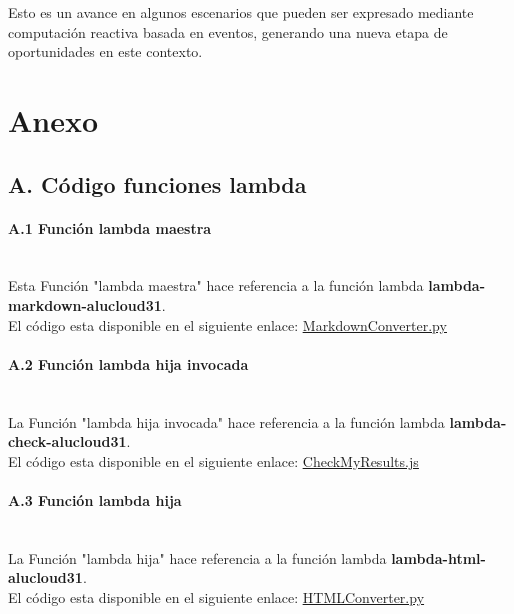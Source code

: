 \documentclass[
]{article}
\begin{document}
Esto es un avance en algunos escenarios que pueden ser expresado mediante computación reactiva basada en eventos, generando una nueva etapa de oportunidades en este contexto.

\newpage
\hypertarget{header-n212}{%
\section{Anexo}\label{header-n212}}

\hypertarget{header-n213}{%
\subsection{A. Código funciones lambda}\label{header-n213}}



\hypertarget{header-n214}{%
\paragraph{A.1 Función lambda maestra}\label{header-n214}}
\leavevmode
\newline
\\
Esta Función "lambda maestra" hace referencia a la función lambda \textbf{lambda-markdown-alucloud31}.\\
El código esta disponible en el siguiente enlace:  \underline{\href{https://github.com/manujose94/FINAL-PROJECT-ICP/blob/main/parent-lambda-code/MarkdownConverter.py}{MarkdownConverter.py}}\\

\hypertarget{header-n216}{%
\paragraph{A.2 Función lambda hija invocada}\label{header-n216}}
\leavevmode
\newline
\\
La Función "lambda hija invocada" hace referencia a la función lambda \textbf{lambda-check-alucloud31}.\\
El código esta disponible en el siguiente enlace:  \underline{\href{https://github.com/manujose94/FINAL-PROJECT-ICP/blob/main/childnode-lambda-code/CheckMyResults.js}{CheckMyResults.js}}\\
\hypertarget{header-n218}{%
\paragraph{A.3 Función lambda hija}\label{header-n218}}
\leavevmode
\newline
\\
La Función "lambda hija" hace referencia a la función lambda \textbf{lambda-html-alucloud31}.\\
El código esta disponible en el siguiente enlace:  \underline{\href{https://github.com/manujose94/FINAL-PROJECT-ICP/blob/main/child-lambda-code/HTMLConverter.py}{HTMLConverter.py}}\\
\end{document}
